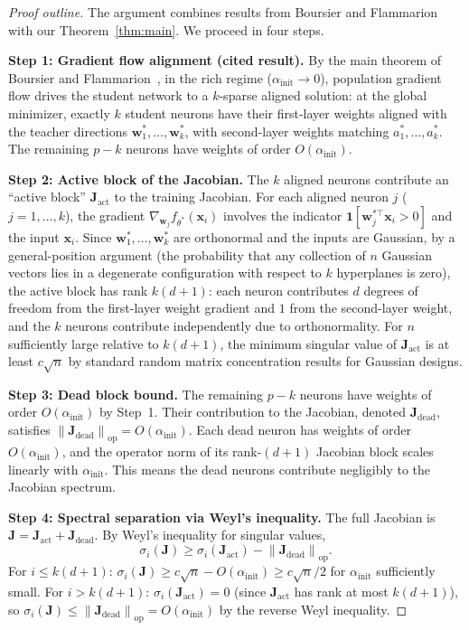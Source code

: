 \documentclass[12pt]{amsart}
\theoremstyle{definition}
\theoremstyle{remark}
\newcommand{\bx}{\mathbf{x}}
\newcommand{\bJ}{\mathbf{J}}
\newcommand{\bw}{\mathbf{w}}
\newcommand{\norm}[1]{\left\lVert #1 \right\rVert}
\begin{document}
\begin{proof}[Proof outline]
The argument combines results from Boursier and Flammarion~\cite{BF2022} with
our Theorem~\ref{thm:main}.  We proceed in four steps.

\medskip
\noindent\textbf{Step 1: Gradient flow alignment (cited result).}
By the main theorem of Boursier and Flammarion~\cite{BF2022}, in the rich regime
($\alpha_{\mathrm{init}} \to 0$), population gradient flow drives the student
network to a $k$-sparse aligned solution: at the global minimizer, exactly $k$
student neurons have their first-layer weights aligned with the teacher
directions $\bw_{1}^{*}, \ldots, \bw_{k}^{*}$, with second-layer weights
matching $a_{1}^{*}, \ldots, a_{k}^{*}$.  The remaining $p - k$ neurons have
weights of order $O(\alpha_{\mathrm{init}})$.

\medskip
\noindent\textbf{Step 2: Active block of the Jacobian.}
The $k$ aligned neurons contribute an ``active block'' $\bJ_{\mathrm{act}}$ to the
training Jacobian.  For each aligned neuron $j$ ($j = 1, \ldots, k$), the
gradient $\nabla_{\bw_{j}} f_{\theta^{*}}(\bx_{i})$ involves the indicator
$\mathbf{1}[\bw_{j}^{*\top}\bx_{i} > 0]$ and the input $\bx_{i}$.  Since
$\bw_{1}^{*}, \ldots, \bw_{k}^{*}$ are orthonormal and the inputs are Gaussian,
by a general-position argument (the probability that any collection of
$n$ Gaussian vectors lies in a degenerate configuration with respect to
$k$ hyperplanes is zero), the active block has rank $k(d+1)$: each neuron
contributes $d$ degrees of freedom from the first-layer weight gradient and $1$
from the second-layer weight, and the $k$ neurons contribute independently due
to orthonormality.  For $n$ sufficiently large relative to $k(d+1)$, the minimum
singular value of $\bJ_{\mathrm{act}}$ is at least $c\sqrt{n}$ by standard
random matrix concentration results for Gaussian designs.

\medskip
\noindent\textbf{Step 3: Dead block bound.}
The remaining $p - k$ neurons have weights of order
$O(\alpha_{\mathrm{init}})$ by Step~1.  Their contribution to the Jacobian,
denoted $\bJ_{\mathrm{dead}}$, satisfies
$\norm{\bJ_{\mathrm{dead}}}_{\mathrm{op}} = O(\alpha_{\mathrm{init}})$.
Each dead neuron has weights of order $O(\alpha_{\mathrm{init}})$, and the
operator norm of its rank-$(d+1)$ Jacobian block scales linearly with
$\alpha_{\mathrm{init}}$.  This means the dead neurons contribute negligibly to
the Jacobian spectrum.

\medskip
\noindent\textbf{Step 4: Spectral separation via Weyl's inequality.}
The full Jacobian is $\bJ = \bJ_{\mathrm{act}} + \bJ_{\mathrm{dead}}$.
By Weyl's inequality for singular values,
\begin{equation}
  \sigma_{i}(\bJ) \geq \sigma_{i}(\bJ_{\mathrm{act}})
    - \norm{\bJ_{\mathrm{dead}}}_{\mathrm{op}}.
\end{equation}
For $i \leq k(d+1)$: $\sigma_{i}(\bJ) \geq c\sqrt{n} - O(\alpha_{\mathrm{init}}) \geq c\sqrt{n}/2$ for $\alpha_{\mathrm{init}}$ sufficiently small.
For $i > k(d+1)$: $\sigma_{i}(\bJ_{\mathrm{act}}) = 0$ (since $\bJ_{\mathrm{act}}$ has rank at most $k(d+1)$), so $\sigma_{i}(\bJ) \leq \norm{\bJ_{\mathrm{dead}}}_{\mathrm{op}} = O(\alpha_{\mathrm{init}})$ by the reverse Weyl inequality.


\end{proof}
\end{document}
